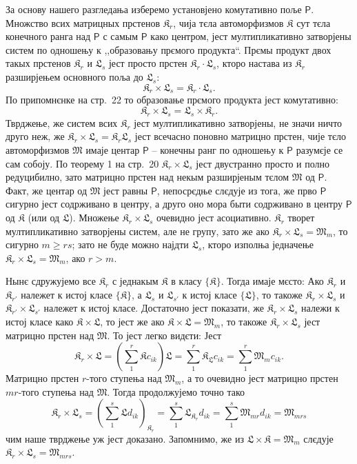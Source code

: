 \documentclass[11pt]{article}
\begin{document}
За основу нашего разгледања изберемо установјено комутативно поље \(\mathsf P\). Множство всих матрицных прстенов \(\mathfrak K_r\), чија тєла автоморфизмов \(\mathfrak K\) сут тєла конечного ранга над \(\mathsf P\) с самым \(\mathsf P\) како центром, јест мултипликативно затворјены систем по одношењу к ,,образовању прємого продукта``. Прємы продукт двох такых прстенов \(\mathfrak K_r\) и \(\mathfrak L_s\) јест просто прстен \(\mathfrak K_r\cdot\mathfrak L_s\), кторо настава из \(\mathfrak K_r\) разширјењем основного поља до \(\mathfrak L_s\):
\[
\mathfrak K_r\times\mathfrak L_s=\mathfrak K_r\cdot\mathfrak L_s.
\]
По припомнєнке на стр.~22 то образовање прємого продукта јест комутативно:
\[
\mathfrak K_r\times\mathfrak L_s=\mathfrak L_s\times\mathfrak K_r.
\]
Тврджење, же систем всих \(\mathfrak K_r\) јест мултипликативно затворјены, не значи ничто друго неж, же \(\mathfrak K_r\times\mathfrak L_s=\mathfrak K_r\mathfrak L_s\) јест всечасно поновно матрицно прстен, чије тєло автоморфизмов \(\mathfrak M\) имаје центар \(\mathsf P\) -- конечны ранг по одношењу к \(\mathsf P\) разумєје се сам собоју. По теорему 1 на стр.~20 \(\mathfrak K_r\times\mathfrak L_s\) јест двустранно просто и полно редуцибилно, зато матрицно прстен над некым разширјеным тєлом \(\mathfrak M\) од \(\mathsf P\). Факт, же центар од \(\mathfrak M\) јест равны \(\mathsf P\), непосрєдње слєдује из тога, же прво \(\mathsf P\) сигурно јест содрживано в центру, а друго оно мора быти содрживано в центру \(\mathsf P\) од \(\mathfrak K\) (или од \(\mathfrak L\)). Множење \(\mathfrak K_r\times\mathfrak L_s\) очевидно јест асоциативно. \(\mathfrak K_r\) творет мултипликативно затворјены систем, але не групу, зато же ако \(\mathfrak K_r\times\mathfrak L_s=\mathfrak M_m\), то сигурно \(m\geq rs\); зато не буде можно најдти \(\mathfrak L_s\), кторо изполња једначење \(\mathfrak K_r\times\mathfrak L_s=\mathfrak M_m\), ако \(r>m\).

Нынє сдружујемо все \(\mathfrak K_r\) с једнакым \(\mathfrak K\) в класу \(\{\mathfrak K\}\). Тогда имаје мєсто: Ако \(\mathfrak K_r\) и \(\mathfrak K_{r'}\) належет к истој класе \(\{\mathfrak K\}\), а \(\mathfrak L_s\) и \(\mathfrak L_{s'}\) к истој класе \(\{\mathfrak L\}\), то такоже \(\mathfrak K_r\times\mathfrak L_s\) и \(\mathfrak K_{r'}\times\mathfrak L_{s'}\) належет к истој класе. Достаточно јест показати, же \(\mathfrak K_r\times\mathfrak L_s\) належи к истој класе како \(\mathfrak K\times\mathfrak L\), то јест же ако \(\mathfrak K\times\mathfrak L=\mathfrak M_m\), то такоже \(\mathfrak K_r\times\mathfrak L_s\) јест матрицно прстен над \(\mathfrak M\). То јест легко видєти: Јест
\[
\mathfrak K_r\times\mathfrak L
=\left(\sum_1^r\mathfrak K c_{ik}\right)\mathfrak L
=\sum_1^r\mathfrak K_{\mathfrak L}c_{ik}
=\sum_1^r\mathfrak M_m c_{ik}.
\]
Матрицно прстен \(r\)-того ступења над \(\mathfrak M_m\), а то очевидно јест матрицно прстен \(mr\)-того ступења над \(\mathfrak M\). Тогда продолжујемо точно тако
\[
\mathfrak K_r\times\mathfrak L_s
=\left(\sum_1^s\mathfrak L d_{ik}\right)_{\mathfrak K_r}
=\sum_1^s\mathfrak L_{\mathfrak K_r}d_{ik}
=\sum_1^s\mathfrak M_{mr}d_{ik}
=\mathfrak M_{mrs}
\]
чим наше тврджење уж јест доказано. Запомнимо, же из \(\mathfrak L\times\mathfrak K=\mathfrak M_m\) слєдује \(\mathfrak K_r\times\mathfrak L_s=\mathfrak M_{mrs}\).
\end{document}
